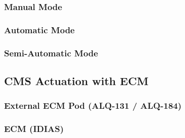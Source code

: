 \documentclass[11pt, a4paper, twoside]{report}
\begin{document}
\subsubsection{Manual Mode}
\label{sec:C5-S2-S1-S1}

\subsubsection{Automatic Mode}
\label{sec:C5-S2-S1-S2}

\subsubsection{Semi-Automatic Mode}
\label{sec:C5-S2-S1-S3}

\subsection{CMS Actuation with ECM}
\label{sec:C5-S2-S2}

\subsubsection{External ECM Pod (ALQ-131 / ALQ-184)}
\label{sec:C5-S2-S2-S1}

\subsubsection{ECM (IDIAS)}
\label{sec:C5-S2-S2-S2}
\end{document}

